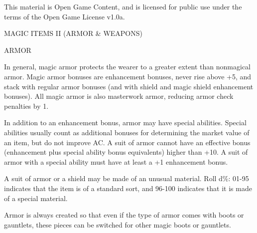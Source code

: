 \documentclass{article}
\begin{document}
This material is Open Game Content, and is licensed for public use under the terms 
of the Open Game License v1.0a.

{\LARGE{}MAGIC ITEMS II (ARMOR \& WEAPONS)}

\vspace{12pt}
ARMOR

In general, magic armor protects the wearer to a greater extent than nonmagical 
armor. Magic armor bonuses are enhancement bonuses, never rise above +5, and stack 
with regular armor bonuses (and with shield and magic shield enhancement bonuses). 
All magic armor is also masterwork armor, reducing armor check penalties by 1.

In addition to an enhancement bonus, armor may have special abilities. Special 
abilities usually count as additional bonuses for determining the market value 
of an item, but do not improve AC. A suit of armor cannot have an effective bonus 
(enhancement plus special ability bonus equivalents) higher than +10. A suit of 
armor with a special ability must have at least a +1 enhancement bonus.

A suit of armor or a shield may be made of an unusual material. Roll d\%: 01-95 
indicates that the item is of a standard sort, and 96-100 indicates that it is 
made of a special material.

Armor is always created so that even if the type of armor comes with boots or gauntlets, 
these pieces can be switched for other magic boots or gauntlets.
\end{document}
